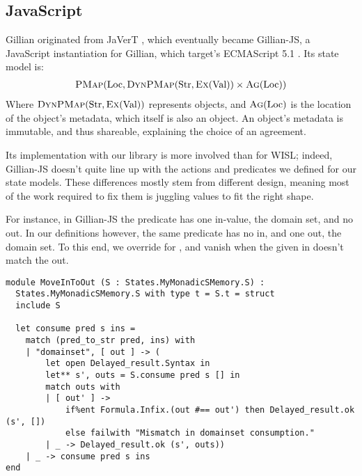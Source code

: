 \subsection{JavaScript}

Gillian originated from JaVerT \cite{javert1,javert2}, which eventually became Gillian-JS, a JavaScript instantiation for Gillian, which target's ECMAScript 5.1 \cite{ecmascript}. Its state model is: \begin{align*}
	\textsc{PMap}(\text{Loc}, \textsc{DynPMap}(\text{Str}, \textsc{Ex}(\text{Val})) \times \textsc{Ag}(\text{Loc}))
\end{align*}
Where $\textsc{DynPMap}(\text{Str}, \textsc{Ex}(\text{Val}))$ represents objects, and $\textsc{Ag}(\text{Loc})$ is the location of the object's metadata, which itself is also an object. An object's metadata is immutable, and thus shareable, explaining the choice of an agreement.

Its implementation with our library is more involved than for WISL; indeed, Gillian-JS doesn't quite line up with the actions and predicates we defined for our state models. These differences mostly stem from different design, meaning most of the work required to fix them is juggling values to fit the right shape.

For instance, in Gillian-JS the \domainset{} predicate has one in-value, the domain set, and no out. In our definitions however, the same predicate has no in, and one out, the domain set. To this end, we override \consume{} for \domainset{}, and vanish when the given in doesn't match the out.
\begin{lstlisting}
module MoveInToOut (S : States.MyMonadicSMemory.S) :
  States.MyMonadicSMemory.S with type t = S.t = struct
  include S

  let consume pred s ins =
    match (pred_to_str pred, ins) with
    | "domainset", [ out ] -> (
        let open Delayed_result.Syntax in
        let** s', outs = S.consume pred s [] in
        match outs with
        | [ out' ] ->
            if%ent Formula.Infix.(out #== out') then Delayed_result.ok (s', [])
            else failwith "Mismatch in domainset consumption."
        | _ -> Delayed_result.ok (s', outs))
    | _ -> consume pred s ins
end
\end{lstlisting}

